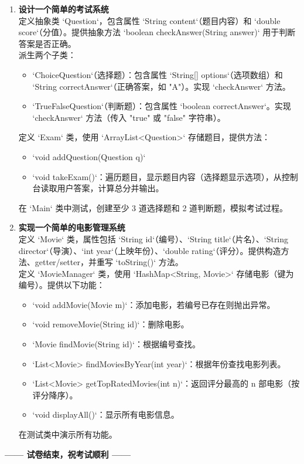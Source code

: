 \documentclass[a3paper, landscape, 11pt, twocolumn]{article}
\begin{document}
\begin{enumerate}[label=\arabic*., itemsep=1em]
	\item \textbf{设计一个简单的考试系统} \\
	      定义抽象类 `Question`，包含属性 `String content`（题目内容）和 `double score`（分值）。提供抽象方法 `boolean checkAnswer(String answer)` 用于判断答案是否正确。\\
	      派生两个子类：
	      \begin{itemize}
		      \item `ChoiceQuestion`（选择题）：包含属性 `String[] options`（选项数组）和 `String correctAnswer`（正确答案，如 "A"）。实现 `checkAnswer` 方法。
		      \item `TrueFalseQuestion`（判断题）：包含属性 `boolean correctAnswer`。实现 `checkAnswer` 方法（传入 "true" 或 "false" 字符串）。
	      \end{itemize}
	      定义 `Exam` 类，使用 `ArrayList<Question>` 存储题目，提供方法：
	      \begin{itemize}
		      \item `void addQuestion(Question q)`
		      \item `void takeExam()`：遍历题目，显示题目内容（选择题显示选项），从控制台读取用户答案，计算总分并输出。
	      \end{itemize}
	      在 `Main` 类中测试，创建至少 3 道选择题和 2 道判断题，模拟考试过程。
	      \vspace{6cm}

	\item \textbf{实现一个简单的电影管理系统} \\
	      定义 `Movie` 类，属性包括 `String id`（编号）、`String title`（片名）、`String director`（导演）、`int year`（上映年份）、`double rating`（评分）。提供构造方法、getter/setter，并重写 `toString()` 方法。\\
	      定义 `MovieManager` 类，使用 `HashMap<String, Movie>` 存储电影（键为编号）。提供以下功能：
	      \begin{itemize}
		      \item `void addMovie(Movie m)`：添加电影，若编号已存在则抛出异常。
		      \item `void removeMovie(String id)`：删除电影。
		      \item `Movie findMovie(String id)`：根据编号查找。
		      \item `List<Movie> findMoviesByYear(int year)`：根据年份查找电影列表。
		      \item `List<Movie> getTopRatedMovies(int n)`：返回评分最高的 n 部电影（按评分降序）。
		      \item `void displayAll()`：显示所有电影信息。
	      \end{itemize}
	      在测试类中演示所有功能。
	      \vspace{6cm}
\end{enumerate}

\begin{center}
	\textbf{—— 试卷结束，祝考试顺利 ——}
\end{center}
\end{document}
